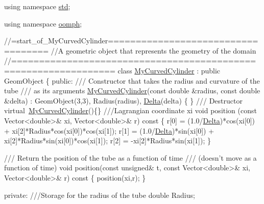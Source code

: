 \begin{DoxyCodeInclude}
\textcolor{keyword}{using namespace }\hyperlink{namespacestd}{std};

\textcolor{keyword}{using namespace }\hyperlink{namespaceoomph}{oomph};


\textcolor{comment}{//=start\_of\_MyCurvedCylinder===================================}
\textcolor{comment}{//A geometric object that represents the geometry of the domain}
\textcolor{comment}{//================================================================}
\textcolor{keyword}{class }\hyperlink{classMyCurvedCylinder}{MyCurvedCylinder} : \textcolor{keyword}{public} GeomObject
\{
\textcolor{keyword}{public}:
\textcolor{comment}{}
\textcolor{comment}{ /// Constructor that takes the radius and curvature of the tube}
\textcolor{comment}{ /// as its arguments}
\textcolor{comment}{} \hyperlink{classMyCurvedCylinder}{MyCurvedCylinder}(\textcolor{keyword}{const} \textcolor{keywordtype}{double} &radius, \textcolor{keyword}{const} \textcolor{keywordtype}{double} &delta) :
  GeomObject(3,3), Radius(radius), \hyperlink{namespaceGlobal__Physical__Variables_add290b9e4a9c0e4c18a13faa7e29d857}{Delta}(delta) \{ \}
 \textcolor{comment}{}
\textcolor{comment}{/// Destructor}
\textcolor{comment}{}\textcolor{keyword}{virtual}~\hyperlink{classMyCurvedCylinder}{MyCurvedCylinder}()\{\}
\textcolor{comment}{}
\textcolor{comment}{///Lagrangian coordinate xi}
\textcolor{comment}{}\textcolor{keywordtype}{void} position (\textcolor{keyword}{const} Vector<double>& xi, Vector<double>& r)\textcolor{keyword}{ const}
\textcolor{keyword}{}\{
 r[0] = (1.0/\hyperlink{namespaceGlobal__Physical__Variables_add290b9e4a9c0e4c18a13faa7e29d857}{Delta})*cos(xi[0]) + xi[2]*Radius*cos(xi[0])*cos(xi[1]);
 r[1] = (1.0/\hyperlink{namespaceGlobal__Physical__Variables_add290b9e4a9c0e4c18a13faa7e29d857}{Delta})*sin(xi[0]) + xi[2]*Radius*sin(xi[0])*cos(xi[1]);
 r[2] = -xi[2]*Radius*sin(xi[1]);
\}

\textcolor{comment}{}
\textcolor{comment}{/// Return the position of the tube as a function of time }
\textcolor{comment}{/// (doesn't move as a function of time)}
\textcolor{comment}{}\textcolor{keywordtype}{void} position(\textcolor{keyword}{const} \textcolor{keywordtype}{unsigned}& t, 
              \textcolor{keyword}{const} Vector<double>& xi, Vector<double>& r)\textcolor{keyword}{ const}
\textcolor{keyword}{  }\{
   position(xi,r);
  \}

\textcolor{keyword}{private}:
\textcolor{comment}{}
\textcolor{comment}{ ///Storage for the radius of the tube}
\textcolor{comment}{} \textcolor{keywordtype}{double} Radius;


\end{DoxyCodeInclude}
